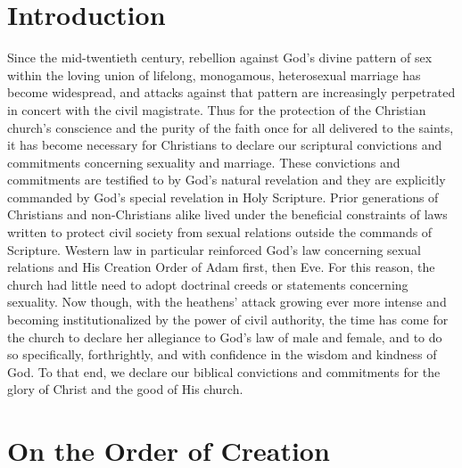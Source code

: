 \documentclass[
]{book}
\begin{document}
\hypertarget{introduction}{%
\section*{Introduction}\label{introduction}}

Since the mid-twentieth century, rebellion against God's divine pattern of sex within the loving union of lifelong, monogamous, heterosexual marriage has become widespread, and attacks against that pattern are increasingly perpetrated in concert with the civil magistrate. Thus for the protection of the Christian church's conscience and the purity of the faith once for all delivered to the saints, it has become necessary for Christians to declare our scriptural convictions and commitments concerning sexuality and marriage. These convictions and commitments are testified to by God's natural revelation and they are explicitly commanded by God's special revelation in Holy Scripture. Prior generations of Christians and non-Christians alike lived under the beneficial constraints of laws written to protect civil society from sexual relations outside the commands of Scripture. Western law in particular reinforced God's law concerning sexual relations and His Creation Order of Adam first, then Eve. For this reason, the church had little need to adopt doctrinal creeds or statements concerning sexuality. Now though, with the heathens' attack growing ever more intense and becoming institutionalized by the power of civil authority, the time has come for the church to declare her allegiance to God's law of male and female, and to do so specifically, forthrightly, and with confidence in the wisdom and kindness of God. To that end, we declare our biblical convictions and commitments for the glory of Christ and the good of His church.

\hypertarget{on-the-order-of-creation}{%
\section*{On the Order of Creation}\label{on-the-order-of-creation}}
\end{document}
